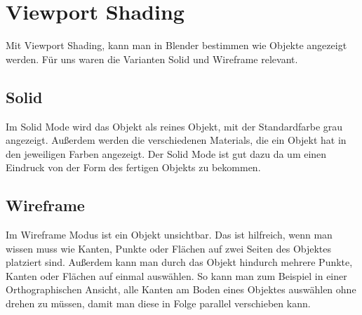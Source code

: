 \section{Viewport Shading}
Mit Viewport Shading, kann man in Blender bestimmen wie Objekte angezeigt werden. Für uns waren die Varianten Solid und Wireframe relevant.

\subsection{Solid}
Im Solid Mode wird das Objekt als reines Objekt, mit der Standardfarbe grau angezeigt. Außerdem werden die verschiedenen Materials, die ein Objekt
hat in den jeweiligen Farben angezeigt. Der Solid Mode ist gut dazu da um einen Eindruck von der Form des fertigen Objekts zu bekommen.

\subsection{Wireframe}
Im Wireframe Modus ist ein Objekt unsichtbar. Das ist hilfreich, wenn man wissen muss wie Kanten, Punkte oder Flächen auf zwei Seiten des Objektes
platziert sind. Außerdem kann man durch das Objekt hindurch mehrere Punkte, Kanten oder Flächen auf einmal auswählen. So kann man zum Beispiel
in einer Orthographischen Ansicht, alle Kanten am Boden eines Objektes auswählen ohne drehen zu müssen, damit man diese in Folge parallel verschieben kann.
